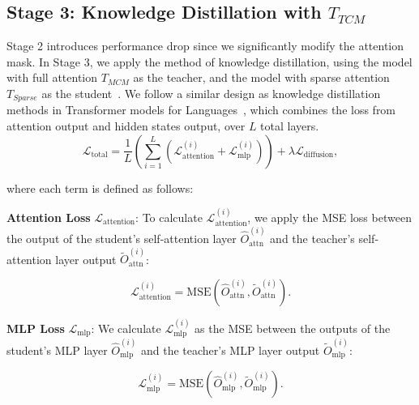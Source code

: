 \subsection{Stage 3: Knowledge Distillation with $T_{TCM}$}
\label{sec:method_distill}
Stage 2 introduces performance drop since we significantly modify the attention mask. In Stage 3, we apply the method of knowledge distillation, using the model with full attention $T_{MCM}$ as the teacher, and the model with sparse attention $T_{Sparse}$ as the student~\citep{hinton2015distilling}. We follow a similar design as knowledge distillation methods in Transformer models for Languages~\citep{gu2024minillm, jiao2019tinybert}, which combines the loss from attention output and hidden states output, over $L$ total layers.
\begin{equation}
\mathcal{L}_{\text{total}} = \frac{1}{L} \left( \sum_{i=1}^{L} \left( \mathcal{L}_{\text{attention}}^{(i)} + \mathcal{L}_{\text{mlp}}^{(i)} \right) \right) + \lambda \mathcal{L}_{\text{diffusion}},
\end{equation}

\noindent where each term is defined as follows:

\textbf{Attention Loss} $\mathcal{L}_{\text{attention}}$: To calculate $\mathcal{L}_{\text{attention}}^{(i)}$, we apply the MSE loss between the output of the student’s self-attention layer $\hat{O}_{\text{attn}}^{(i)}$ and the teacher’s self-attention layer output $\tilde{O}_{\text{attn}}^{(i)}$:

\begin{equation}
\mathcal{L}_{\text{attention}}^{(i)} = \text{MSE}(\hat{O}_{\text{attn}}^{(i)}, \tilde{O}_{\text{attn}}^{(i)}).
\end{equation}

\textbf{MLP Loss} $\mathcal{L}_{\text{mlp}}$: We calculate $\mathcal{L}_{\text{mlp}}^{(i)}$ as the MSE between the outputs of the student's MLP layer $\hat{O}_{\text{mlp}}^{(i)}$ and the teacher's MLP layer output $\tilde{O}_{\text{mlp}}^{(i)}$:

\begin{equation}
\mathcal{L}_{\text{mlp}}^{(i)} = \text{MSE}(\hat{O}_{\text{mlp}}^{(i)}, \tilde{O}_{\text{mlp}}^{(i)}).
\end{equation}


